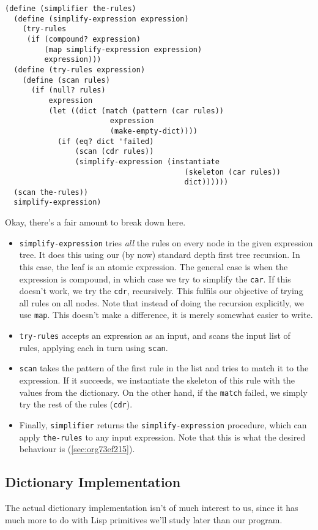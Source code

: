 \documentclass[9pt]{report}
\begin{document}
\begin{verbatim}
(define (simplifier the-rules)
  (define (simplify-expression expression)
    (try-rules
     (if (compound? expression)
         (map simplify-expression expression)
         expression)))
  (define (try-rules expression)
    (define (scan rules)
      (if (null? rules)
          expression
          (let ((dict (match (pattern (car rules))
                        expression
                        (make-empty-dict))))
            (if (eq? dict 'failed)
                (scan (cdr rules))
                (simplify-expression (instantiate
                                         (skeleton (car rules))
                                         dict))))))
  (scan the-rules))
  simplify-expression)
\end{verbatim}

Okay, there's a fair amount to break down here.
\begin{itemize}
\item \texttt{simplify-expression} tries \emph{all} the rules on every node in the
given expression tree. It does this using our (by now) standard
depth first tree recursion. In this case, the leaf is an atomic
expression. The general case is when the expression is compound,
in which case we try to simplify the \texttt{car}. If this doesn't
work, we try the \texttt{cdr}, recursively. This fulfils our objective
of trying all rules on all nodes. Note that instead of doing the
recursion explicitly, we use \texttt{map}. This doesn't make a
difference, it is merely somewhat easier to write.
\item \texttt{try-rules} accepts an expression as an input, and scans the
input list of rules, applying each in turn using \texttt{scan}.
\item \texttt{scan} takes the pattern of the first rule in the list and tries
to match it to the expression. If it succeeds, we instantiate
the skeleton of this rule with the values from the dictionary.
On the other hand, if the \texttt{match} failed, we simply try the rest
of the rules (\texttt{cdr}).
\item Finally, \texttt{simplifier} returns the \texttt{simplify-expression}
procedure, which can apply \texttt{the-rules} to any input expression.
Note that this is what the desired behaviour is (\ref{sec:org73ef215}).
\end{itemize}

\subsection{Dictionary Implementation}
\label{sec:orgc62e178}
The actual dictionary implementation isn't of much interest to us,
since it has much more to do with Lisp primitives we'll study
later than our program.
\end{document}
